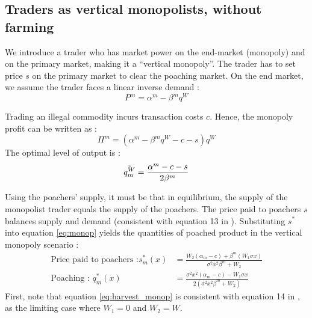 \subsection{Traders as vertical monopolists, without farming}
We introduce a trader who has market power on the end-market (monopoly) and on the primary market, making it a \enquote{vertical monopoly}. The trader has to set price $s$ on the primary market to clear the poaching market. On the end market, we assume the trader faces a linear inverse demand : 
\begin{equation}
    P^m = \alpha^m - \beta^m q^W
\label{eq:inv_demand_monop}
\end{equation}

Trading an illegal commodity incurs transaction costs $c$. Hence, the monopoly profit can be written as : 
\begin{equation}
    \Pi^m = (\alpha^m - \beta^mq^W - c -s )q^W
    \label{eq:profit_monop}
\end{equation}
The optimal level of output is : 
\begin{equation}
    \Tilde{q_m^W}=\frac{\alpha^m - c - s}{2\beta^m}
    \label{eq:monop}
\end{equation}

Using the poachers' supply, it must be that in equilibrium, the supply of the monopolist trader equals the supply of the poachers. The price paid to poachers $s$ balances supply and demand (consistent with equation 13 in \cite{damania_economics_2007}). Substituting $s^*$ into equation \ref{eq:monop} yields the quantities of poached product in the vertical monopoly scenario : 
\begin{align}
    \text{Price paid to poachers :} s^*_m(x) &= \frac{W_2 (\alpha_m -c) + \beta^m (W_1 \sigma x) }{ \sigma^2 x^2 \beta^m + W_2 }\\
        \text{Poaching : } q^*_m(x) &=\frac{\sigma^2 x^2 (\alpha_m - c) - W_1 \sigma x}{2(\sigma^2 x^2 \beta^m +W_2)}
    \label{eq:harvest_monop}
\end{align}
First, note that equation \ref{eq:harvest_monop} is consistent with equation 14 in \cite{damania_economics_2007}, as the limiting case where $W_1= 0$ and $W_2 = W$. 
 

